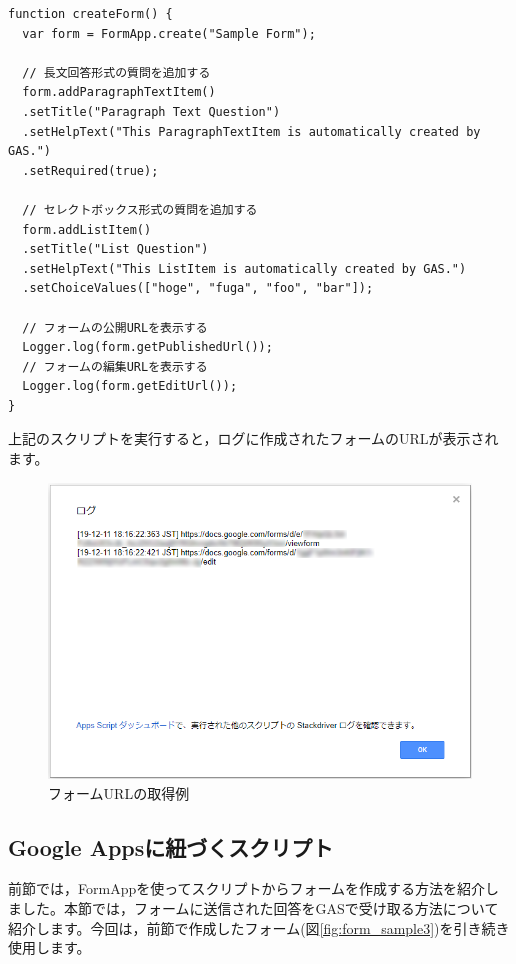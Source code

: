 \documentclass[uplatex,a4j]{jsarticle}
\begin{document}
\begin{lstlisting}[basicstyle=\ttfamily\footnotesize,frame=single,caption=FormApp sample 6]
function createForm() {
  var form = FormApp.create("Sample Form");
  
  // 長文回答形式の質問を追加する
  form.addParagraphTextItem()
  .setTitle("Paragraph Text Question")
  .setHelpText("This ParagraphTextItem is automatically created by GAS.")
  .setRequired(true);
  
  // セレクトボックス形式の質問を追加する
  form.addListItem()
  .setTitle("List Question")
  .setHelpText("This ListItem is automatically created by GAS.")
  .setChoiceValues(["hoge", "fuga", "foo", "bar"]);
  
  // フォームの公開URLを表示する
  Logger.log(form.getPublishedUrl());
  // フォームの編集URLを表示する
  Logger.log(form.getEditUrl());
}
\end{lstlisting}

上記のスクリプトを実行すると，ログに作成されたフォームのURLが表示されます。

\begin{figure}[H]
 \centering
 \includegraphics[keepaspectratio, scale=0.5]{images/form_sample2.png}
 \caption{フォームURLの取得例}
 \label{fig:form_sample2}
\end{figure}

\subsection{Google Appsに紐づくスクリプト}
\label{subsec:event_object}

前節では，FormAppを使ってスクリプトからフォームを作成する方法を紹介しました。本節では，フォームに送信された回答をGASで受け取る方法について紹介します。今回は，前節で作成したフォーム(図\ref{fig:form_sample3})を引き続き使用します。
\end{document}
